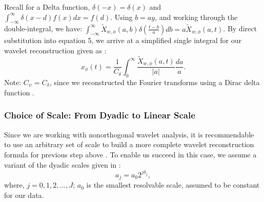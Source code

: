 \documentclass[conference]{IEEEtran}
\begin{document}
Recall for a Delta function, $\delta(-x)=\delta(x)$ and $\int_{-\infty}^{\infty}\delta(x-d)f(x) dx=f(d)$.
Using $b=ay$, and working through the double-integral, we have: $\int_{-\infty}^{\infty} \tilde{X}_{w,\phi}(a,b)\delta\left(\frac{t-b}{a}\right)db = a\tilde{X}_{w,\phi}(a,t)$.
By direct substitution into equation 5, we arrive at a simplified single integral for our wavelet reconstruction given as \cite{doi:10.1146/annurev.fl.24.010192.002143}\cite{Roy_2022}\cite{APracticalGuidetoWaveletAnalysis}:\begin{equation}     x_{\phi}(t) = \frac{1}{C_{\delta}} \int_{0}^{\infty}\frac{\tilde{X}_{w,\phi}(a,t)}{|a|}\frac{da}{a}.\end{equation}Note: $C_{\psi}=C_{\delta}$, since we reconstructed the Fourier transforms using a Dirac delta function \cite{APracticalGuidetoWaveletAnalysis}.
\subsubsection{Choice of Scale: From Dyadic to Linear Scale}Since we are working with nonorthogonal wavelet analysis, it is recommendable to use an arbitrary set of scale to build a more complete wavelet reconstruction formula for previous step above \cite{APracticalGuidetoWaveletAnalysis}. To enable us succeed in this case, we assume a variant of the dyadic scales given in \cite{pereyra2012harmonic}\cite{APracticalGuidetoWaveletAnalysis}: \begin{equation}    a_{j} =a_{0}2^{j\delta_{j}},\end{equation}where, $j=0,1,2,...,J$; $a_{0}$ is the smallest resolvable scale, assumed to be constant for our data. 
\end{document}
